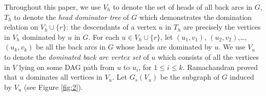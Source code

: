 \documentclass[11pt]{article}
\begin{document}
Throughout this paper, we use $V_h$ to denote the set of heads of all back arcs in $G$, $T_h$ to denote the \emph{head dominator tree} of $G$ which demonstrates the domination relation on $V_h\cup \{r\}$: the descendants of a vertex $u$ in $T_h$ are precisely the vertices in $V_h$ dominated by $u$ in $G$. For each $u\in V_h\cup\{r\}$, let $(u_1,v_1)$, $(u_2,v_2)$,\dots,$(u_k,v_k)$ be all the back arcs in $G$ whose heads are dominated by $u$. We use $V_u$ to denote the \emph{dominated back arc vertex set} of $u$ which consists of all the vertices in $V$ lying on some DAG path from $u$ to $u_i$, for $1\leq i\leq k$. Ramachandran \cite{Rama1,Rama2} proved that $u$ dominates all vertices in $V_u$. Let $G_s(V_u)$ be the subgraph of $G$ induced by $V_u$ (see Figure \ref{fig:2}).

\begin{figure}
    \centering

\end{figure}
\end{document}
